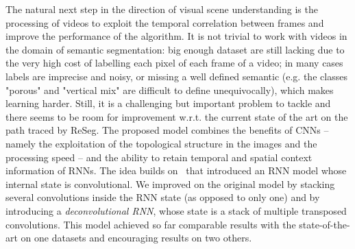 The natural next step in the direction of visual scene understanding is the
processing of videos to exploit the temporal correlation between frames and
improve the performance of the algorithm. It is not trivial to work with videos
in the domain of semantic segmentation: big enough dataset are still lacking
due to the very high cost of labelling each pixel of each frame of a video; in
many cases labels are imprecise and noisy, or missing a well defined semantic
(e.g. the classes "porous" and "vertical mix" are difficult to define
unequivocally), which makes learning harder. Still, it is a challenging but
important problem to tackle and there seems to be room for improvement w.r.t.
the current state of the art on the path traced by ReSeg. The proposed model
combines the benefits of CNNs -- namely the exploitation of the topological
structure in the images and the processing speed -- and the ability to retain
temporal and spatial context information of RNNs. The idea builds on~\cite{
xingjian2015convolutional} that introduced an RNN model whose internal state is
convolutional. We improved on the original model by stacking several
convolutions inside the RNN state (as opposed to only one) and by introducing a
\emph{deconvolutional RNN}, whose state is a stack of multiple transposed
convolutions. This model achieved so far comparable results with the
state-of-the-art on one datasets and encouraging results on two others.


